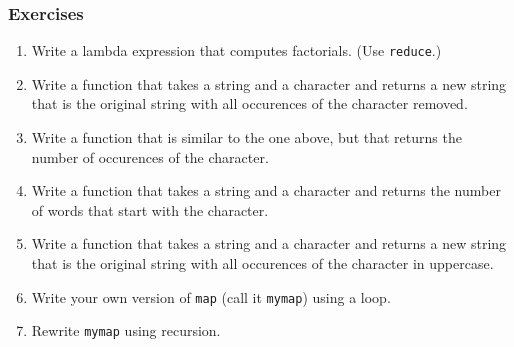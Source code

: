 \documentclass[10pt]{beamer}
\begin{document}
\begin{frame}
	\frametitle{Exercises}
	\begin{enumerate}
		\item Write a lambda expression that computes factorials.
			(Use \texttt{reduce}.)
		\item Write a function that takes a string and a character
			and returns a new string that is the original string with
			all occurences of the character removed.
		\item Write a function that is similar to the one above, but 
			that returns the number of occurences of the character.
		\item Write a function that takes a string and a character
			and returns the number of words that start with the
			character.
		\item Write a function that takes a string and a character
			and returns a new string that is the original string with
			all occurences of the character in uppercase.
		\item Write your own version of \texttt{map} (call it
			\texttt{mymap}) using a loop.
		\item Rewrite \texttt{mymap} using recursion.
	\end{enumerate}
\end{frame}
\end{document}

